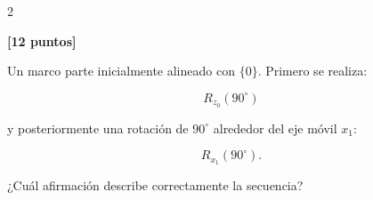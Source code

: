 \documentclass[10pt]{article}
\begin{document}
\begin{multicols}{2}
\begin{question}
            \begin{answers}
                \answer{
                    \[
                    R
                    =
                    R_z(90^\circ)R_x(90^\circ)
                    \]
                }

                \answer{
                    \[
                    R
                    =
                    R_x(90^\circ)R_z(90^\circ)
                    \]
                }

                \answer{
                    \[
                    R
                    =
                    R_z(-90^\circ)R_x(90^\circ)
                    \]
                }

                \answer{
                    \[
                    R
                    =
                    R_x(-90^\circ)R_z(-90^\circ)
                    \]
                }
            \end{answers}
        \end{question}




        \begin{question}
            \textbf{[12 puntos]}

            Un marco parte inicialmente alineado con \(\{0\}\).
            Primero se realiza:

            \[
            R_{z_0}(90^\circ)
            \]

            y posteriormente una rotación de \(90^\circ\) alrededor del
            eje móvil \(x_1\):

            \[
            R_{x_1}(90^\circ).
            \]

            ¿Cuál afirmación describe correctamente la secuencia?

            \begin{answers}


\end{answers}
\end{question}
\end{multicols}
\end{document}
